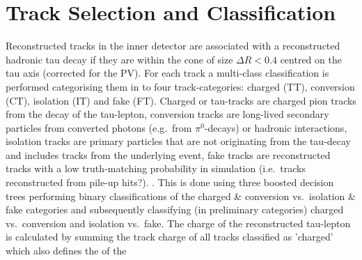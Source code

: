 \section{Track Selection and Classification}
\label{sec:reco_track_sel_classif}
%
Reconstructed tracks in the inner detector are associated with a reconstructed
hadronic tau decay if they are within the cone of size $\Delta R < 0.4$ centred
on the tau axis (corrected for the PV).
%
%
%
For each track a multi-class classification is performed categorising them in to
four track-categories: charged (TT), conversion (CT), isolation (IT) and fake
(FT). Charged or tau-tracks are charged pion tracks from the decay of the
tau-lepton, conversion tracks are long-lived secondary particles from converted
photons (e.g.\ from $\pi^0$-decays) or hadronic interactions, isolation tracks
are primary particles that are not originating from the tau-decay and includes
tracks from the underlying event, fake tracks are reconstructed tracks with a low
truth-matching probability in simulation (i.e.\ tracks reconstructed from
pile-up hits?). . This is
done using three boosted decision trees performing binary classifications of the
charged \& conversion vs.\ isolation \& fake categories and subsequently
classifying (in preliminary categories) charged vs.\ conversion and isolation
vs.\ fake.  The charge
of the reconstructed tau-lepton is calculated by summing the track charge of all
tracks classified as 'charged' which also defines the  of the
